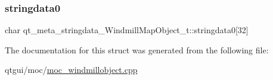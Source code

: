 \subsubsection{\texorpdfstring{stringdata0}{stringdata0}}
{\footnotesize\ttfamily char qt\+\_\+meta\+\_\+stringdata\+\_\+\+Windmill\+Map\+Object\+\_\+t\+::stringdata0\mbox{[}32\mbox{]}}



The documentation for this struct was generated from the following file\+:\begin{DoxyCompactItemize}
\item 
qtgui/moc/\mbox{\hyperlink{moc__windmillobject_8cpp}{moc\+\_\+windmillobject.\+cpp}}\end{DoxyCompactItemize}
